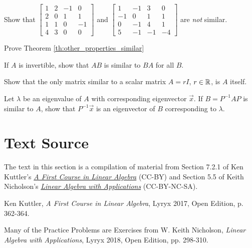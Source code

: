 \documentclass{ximera}
\begin{document}
 

 
\begin{problem}\label{prob:notsimilar_4x4}
Show that $\begin{bmatrix}
1 & 2 & -1 &  0 \\
2 & 0 &  1 &  1 \\
1 & 1 &  0 & -1 \\
4 & 3 & 0 & 0
\end{bmatrix}$ and $
\begin{bmatrix}
  1 & -1 &  3 &  0 \\
 -1 &  0 &  1 &  1 \\
  0 & -1 &  4 &  1 \\
  5 & -1 & -1 & -4
\end{bmatrix}$ are \textit{not} similar.
\end{problem}
 
\begin{problem}\label{prob:similarproperties}
Prove Theorem \ref{th:other_properties_similar}
\end{problem}
 
\begin{problem}\label{prob:similarproperties_invertible}
If $A$ is invertible, show that $AB$ is similar to $BA$ for all $B$.
\end{problem}
 
\begin{problem}\label{prob:similarproperties_rI}
Show that the only matrix similar to a scalar matrix $A = rI$, $r\in\mathbb{R}$, is $A$ itself.
\end{problem}
 
\begin{problem}\label{prob:similarproperties_ev}
Let $\lambda$ be an eigenvalue of $A$ with corresponding eigenvector $\vec{x}$. If $B = P^{-1}AP$ is similar to $A$, show that $P^{-1}\vec{x}$ is an eigenvector of $B$ corresponding to $\lambda$.
\end{problem}
 
 
 
\section*{Text Source}
The text in this section is a compilation of material from Section 7.2.1 of Ken Kuttler's \href{https://open.umn.edu/opentextbooks/textbooks/a-first-course-in-linear-algebra-2017}{\it A First Course in Linear Algebra} (CC-BY) and Section 5.5 of Keith Nicholson's \href{https://open.umn.edu/opentextbooks/textbooks/linear-algebra-with-applications}{\it Linear Algebra with Applications} (CC-BY-NC-SA).
 
Ken Kuttler, {\it  A First Course in Linear Algebra}, Lyryx 2017, Open Edition, p. 362-364.
 
Many of the Practice Problems are Exercises from
W. Keith Nicholson, {\it Linear Algebra with Applications}, Lyryx 2018, Open Edition, pp. 298-310.
\end{document}
